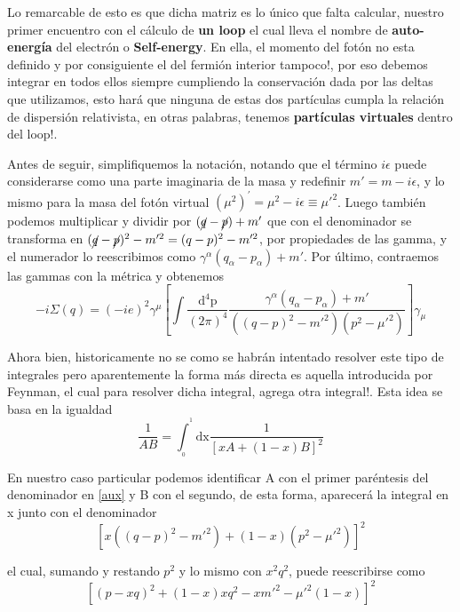 \documentclass{article}
\numberwithin{equation}{section}
\begin{document}
Lo remarcable de esto es que dicha matriz es lo único que falta calcular, nuestro primer encuentro con el cálculo de \textbf{un loop} el cual lleva el nombre de \textbf{auto-energía} del electrón o \textbf{Self-energy}. En ella, el momento del fotón no esta definido y por consiguiente
el del fermión interior tampoco!, por eso debemos integrar en todos
ellos siempre cumpliendo la conservación dada por las deltas que utilizamos,
esto hará que ninguna de estas dos partículas cumpla la relación de
dispersión relativista, en otras palabras, tenemos \textbf{partículas
virtuales} dentro del loop!.

Antes de seguir, simplifiquemos la notación, notando que el término
$i\epsilon$ puede considerarse como una parte imaginaria de la masa
y redefinir $m'=m-i\epsilon$, y lo mismo para la masa del fotón virtual $\left(\mu^{2}\right)^{'}=\mu^{2}-i\epsilon\equiv\mu'^{2}$.
Luego también podemos multiplicar y dividir por $(\cancel{q}-\cancel{p})+m'$
que con el denominador se transforma en $(\cancel{q}-\cancel{p})^{2}-m'^{2}=(q-p)^{2}-m'^{2}$,
por propiedades de las gamma, y el numerador lo reescribimos como
$\gamma^{\alpha}(q_{\alpha}-p_{\alpha})+m'$. Por último, contraemos
las gammas con la métrica y obtenemos
\begin{equation}\label{aux}
-i\Sigma(q)=(-ie)^{2}\gamma^{\mu}\left[\int\frac{\mathrm{\mathrm{d^4}p}}{(2\pi)^{4}}\frac{\gamma^{\alpha}(q_{\alpha}-p_{\alpha})+m'}{\left((q-p)^{2}-m'^{2}\right)\left(p^{2}-\mu'^{2}\right)}\right]\gamma_{\mu}
\end{equation}

Ahora bien, historicamente no se como se habrán intentado resolver
este tipo de integrales pero aparentemente la forma más directa es
aquella introducida por Feynman, el cual para resolver dicha integral,
agrega otra integral!. Esta idea se basa en la igualdad
\begin{equation}\label{integralfeynman2}
\frac{1}{AB}=\int_{_{0}}^{^{1}}\mathrm{dx}\frac{1}{\left[xA+(1-x)B\right]^{2}}
\end{equation}

En nuestro caso particular podemos identificar A con el primer paréntesis
del denominador en \ref{aux} y B con el segundo, de esta forma, aparecerá
la integral en x junto con el denominador
\begin{equation}
\left[x\left((q-p)^{2}-m'^{2}\right)+(1-x)\left(p^{2}-\mu'^{2}\right)\right]^{2}
\end{equation}

el cual, sumando y restando $ p^2 $ y lo mismo con $ x^2q^2 $, puede reescribirse como 
\begin{equation}
\left[\left(p-xq\right)^{2}+(1-x)xq^{2}-xm'^{2}-\mu'^{2}(1-x)\right]^{2}
\end{equation}
\end{document}
